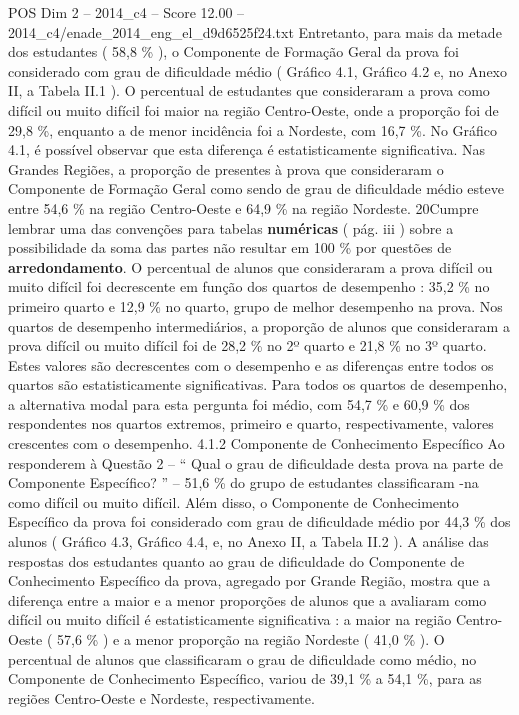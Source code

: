 \begin{textsample}{POS Dim 2 – 2014\_c4 – Score 12.00 – 2014\_c4/enade\_2014\_eng\_el\_d9d6525f24.txt}
Entretanto, para mais da metade dos estudantes ( 58,8 \% ), o Componente de Formação Geral da prova foi considerado com grau de dificuldade médio ( Gráfico 4.1, Gráfico 4.2 e, no Anexo II, a Tabela II.1 ).
O percentual de estudantes que consideraram a prova como difícil ou muito difícil foi maior na região Centro-Oeste, onde a proporção foi de 29,8 \%, enquanto a de menor incidência foi a Nordeste, com 16,7 \%.
No Gráfico 4.1, é possível observar que esta diferença é estatisticamente significativa.
Nas Grandes Regiões, a proporção de presentes à prova que consideraram o Componente de Formação Geral como sendo de grau de dificuldade médio esteve entre 54,6 \% na região Centro-Oeste e 64,9 \% na região Nordeste. 20Cumpre lembrar uma das convenções para tabelas \textbf{numéricas} ( pág. iii ) sobre a possibilidade da soma das partes não resultar em 100 \% por questões de \textbf{arredondamento}.
O percentual de alunos que consideraram a prova difícil ou muito difícil foi decrescente em função dos quartos de desempenho : 35,2 \% no primeiro quarto e 12,9 \% no quarto, grupo de melhor desempenho na prova.
Nos quartos de desempenho intermediários, a proporção de alunos que consideraram a prova difícil ou muito difícil foi de 28,2 \% no 2º quarto e 21,8 \% no 3º quarto.
Estes valores são decrescentes com o desempenho e as diferenças entre todos os quartos são estatisticamente significativas.
Para todos os quartos de desempenho, a alternativa modal para esta pergunta foi médio, com 54,7 \% e 60,9 \% dos respondentes nos quartos extremos, primeiro e quarto, respectivamente, valores crescentes com o desempenho. 4.1.2 Componente de Conhecimento Específico Ao responderem à Questão 2 – “ Qual o grau de dificuldade desta prova na parte de Componente Específico? ” – 51,6 \% do grupo de estudantes classificaram -na como difícil ou muito difícil.
Além disso, o Componente de Conhecimento Específico da prova foi considerado com grau de dificuldade médio por 44,3 \% dos alunos ( Gráfico 4.3, Gráfico 4.4, e, no Anexo II, a Tabela II.2 ).
A análise das respostas dos estudantes quanto ao grau de dificuldade do Componente de Conhecimento Específico da prova, agregado por Grande Região, mostra que a diferença entre a maior e a menor proporções de alunos que a avaliaram como difícil ou muito difícil é estatisticamente significativa : a maior na região Centro-Oeste ( 57,6 \% ) e a menor proporção na região Nordeste ( 41,0 \% ).
O percentual de alunos que classificaram o grau de dificuldade como médio, no Componente de Conhecimento Específico, variou de 39,1 \% a 54,1 \%, para as regiões Centro-Oeste e Nordeste, respectivamente.

\end{textsample}
